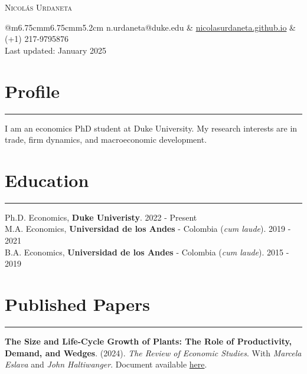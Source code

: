 \documentclass[12pt, letterpaper]{article}
\begin{document}
 

\begin{center}
{\Huge \textsc{Nicolás Urdaneta}}
\vspace*{5mm}

\begin{tabular}{@{}m{6.75cm}m{6.75cm}m{5.2cm}}
\noindent n.urdaneta@duke.edu & \href{nicolasurdaneta.github.io}{nicolasurdaneta.github.io} & (+1) 217-9795876 \\
Last updated: January 2025
\end{tabular}
\vspace*{-7mm}

\end{center}
\section*{Profile}
\vspace*{-8mm}
\noindent \rule{\linewidth}{0.2mm}
\noindent I am an economics PhD student at Duke University. My research interests are in trade, firm dynamics, and macroeconomic development. 

\vspace*{-4mm}

\section*{Education}
\vspace*{-8mm}
\noindent \rule{\linewidth}{0.2mm}
\noindent
Ph.D. Economics, \textbf{Duke Univeristy}. \hfill 2022 - Present \\
M.A. Economics, \textbf{Universidad de los Andes} - Colombia (\textit{cum laude}). \hfill 2019 - 2021 \\
B.A. Economics, \textbf{Universidad de los Andes} - Colombia (\textit{cum laude}). \hfill 2015 - 2019

\vspace*{-2mm}

\section*{Published Papers}
\vspace*{-8mm}
\noindent \rule{\linewidth}{0.2mm}
\noindent \textbf{The Size and Life-Cycle Growth of Plants: The Role of Productivity, Demand, and Wedges}. (2024). \textit{The Review of Economic Studies}.   With \textit{Marcela Eslava} and \textit{John Haltiwanger}. Document available \href{https://academic.oup.com/restud/advance-article/doi/10.1093/restud/rdad029/7054272?login=true}{here}. \\ [-3mm]
\end{document}
